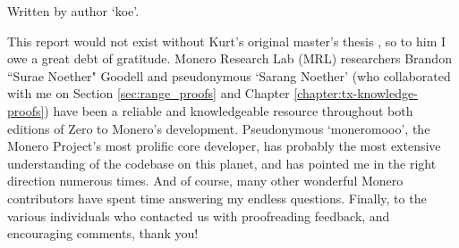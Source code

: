 Written by author `koe'.

This report would not exist without Kurt's original master's thesis \cite{kurt-original}, so to him I owe a great debt of gratitude. Monero Research Lab (MRL) researchers Brandon ``Surae Noether" Goodell and pseudonymous `Sarang Noether' (who collaborated with me on Section \ref{sec:range_proofs} and Chapter \ref{chapter:tx-knowledge-proofs}) have been a reliable and knowledgeable resource throughout both editions of Zero to Monero's development. Pseudonymous `moneromooo', the Monero Project's most prolific core developer, has probably the most extensive understanding of the codebase on this planet, and has pointed me in the right direction numerous times. And of course, many other wonderful Monero contributors have spent time answering my endless questions. Finally, to the various individuals who contacted us with proofreading feedback, and encouraging comments, thank you!